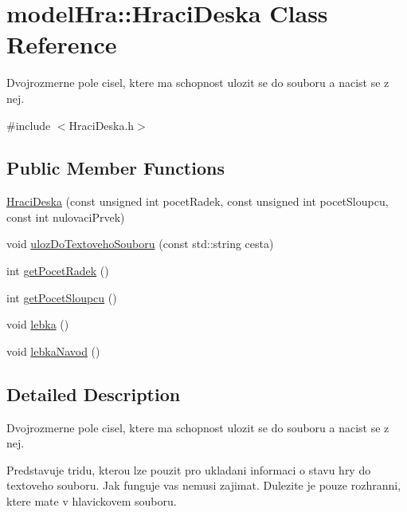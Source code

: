 \hypertarget{classmodel_hra_1_1_hraci_deska}{\section{model\-Hra\-:\-:Hraci\-Deska Class Reference}
\label{classmodel_hra_1_1_hraci_deska}
}


Dvojrozmerne pole cisel, ktere ma schopnost ulozit se do souboru a nacist se z nej.  




{\ttfamily \#include $<$Hraci\-Deska.\-h$>$}

\subsection*{Public Member Functions}
\begin{DoxyCompactItemize}
\item 
\hyperlink{classmodel_hra_1_1_hraci_deska_ad5d42530e5984012b53c42303b4b3824}{Hraci\-Deska} (const unsigned int pocet\-Radek, const unsigned int pocet\-Sloupcu, const int nulovaci\-Prvek)
\item 
void \hyperlink{classmodel_hra_1_1_hraci_deska_a06d3665d2779c5788f365837a6636df4}{uloz\-Do\-Textoveho\-Souboru} (const std\-::string cesta)
\item 
int \hyperlink{classmodel_hra_1_1_hraci_deska_a31ec989ec418c7137c7a8b5fcc4b0a09}{get\-Pocet\-Radek} ()
\item 
int \hyperlink{classmodel_hra_1_1_hraci_deska_a7504033ae87eaf70bb1ae68b0ef8a31f}{get\-Pocet\-Sloupcu} ()
\item 
void \hyperlink{classmodel_hra_1_1_hraci_deska_a282594d3fced2e380b03c38cede115e5}{lebka} ()
\item 
void \hyperlink{classmodel_hra_1_1_hraci_deska_acfec587ad79d750f72afb6862438e08b}{lebka\-Navod} ()
\end{DoxyCompactItemize}


\subsection{Detailed Description}
Dvojrozmerne pole cisel, ktere ma schopnost ulozit se do souboru a nacist se z nej. 

Predstavuje tridu, kterou lze pouzit pro ukladani informaci o stavu hry do textoveho souboru. Jak funguje vas nemusi zajimat. Dulezite je pouze rozhranni, ktere mate v hlavickovem souboru. 

